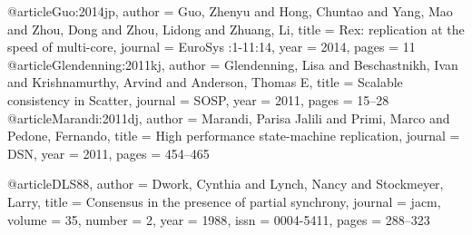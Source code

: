 @article{Guo:2014jp,
author    = {Guo, Zhenyu and Hong, Chuntao and Yang, Mao and Zhou, Dong and Zhou, Lidong and Zhuang, Li},
title     = {{Rex: replication at the speed of multi-core}},
journal   = {EuroSys :1-11:14},
year      = {2014},
pages     = {11}
}
@article{Glendenning:2011kj,
author    = {Glendenning, Lisa and Beschastnikh, Ivan and Krishnamurthy, Arvind and Anderson, Thomas E},
title     = {{Scalable consistency in Scatter}},
journal   = {SOSP},
year      = {2011},
pages     = {15--28}
}
@article{Marandi:2011dj,
author    = {Marandi, Parisa Jalili and Primi, Marco and Pedone, Fernando},
title     = {{High performance state-machine replication}},
journal   = {DSN},
year      = {2011},
pages     = {454--465}
}

@article{DLS88,
 author = {Dwork, Cynthia and Lynch, Nancy and Stockmeyer, Larry},
 title = {Consensus in the presence of partial synchrony},
 journal = jacm,
 volume = {35},
 number = {2},
 year = {1988},
 issn = {0004-5411},
 pages = {288--323}
}